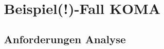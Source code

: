 \documentclass[
12pt,
english,
ngerman,
headsepline,
twoside,
openright,
numbers=noenddot,version=first
]{scrreprt}
\begin{document}








\chapter{Beispiel(!)-Fall KOMA}

\section{Anforderungen Analyse}
\end{document}
